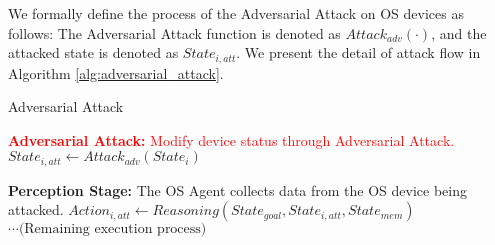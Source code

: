 We formally define the process of the Adversarial Attack on OS devices as follows: The Adversarial Attack function is denoted as $Attack_{adv}(\cdot)$, and the attacked state is denoted as $State_{i,att}$. We present the detail of attack flow in Algorithm \ref{alg:adversarial_attack}.



\begin{algorithm}[t]
\caption{Adversarial Attack}
\label{alg:adversarial_attack}
\LinesNumbered %

\textcolor{red}{\textbf{Adversarial Attack:} Modify device status through Adversarial Attack.} 
 $State_{i,att} \leftarrow Attack_{adv}(State_i)$ 

\textbf{Perception Stage:} The OS Agent
collects data from the OS device being attacked.
$Action_{i,att} \leftarrow Reasoning(State_{goal}, State_{i,att}, State_{mem})$ \\

$\cdots \text{(Remaining execution process)}$
\end{algorithm}